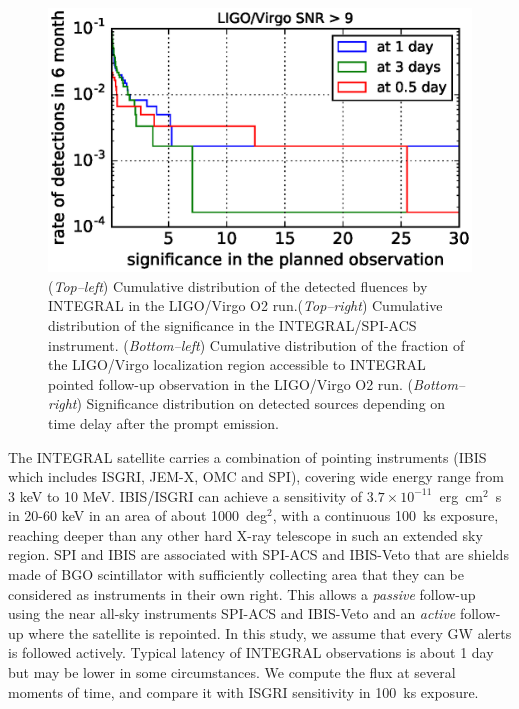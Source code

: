 \documentclass[11pt]{article}
\begin{document}
\begin{figure}
    \includegraphics[scale=.4]{P7-1_f4.eps}
    \caption{(\textit{Top--left}) Cumulative distribution of the detected
      fluences by INTEGRAL in the LIGO/Virgo O2 run.(\textit{Top--right})
      Cumulative distribution of the significance in the INTEGRAL/SPI-ACS
      instrument.  (\textit{Bottom--left}) Cumulative distribution of the
      fraction of the LIGO/Virgo localization region accessible to INTEGRAL
      pointed follow-up observation in the LIGO/Virgo O2
      run. (\textit{Bottom--right}) Significance distribution on detected
      sources depending on time delay after the prompt emission.}
    \label{fluence_significance}
\end{figure}

The INTEGRAL satellite \citep{integral} carries a combination of pointing
instruments (IBIS which includes ISGRI, JEM-X, OMC and SPI), covering wide
energy range from 3 keV to 10 MeV. IBIS/ISGRI can achieve a sensitivity of $3.7
\times 10^{-11}$~erg~cm$^2$~s in 20-60 keV in an area of about 1000~deg$^{2}$,
with a continuous 100~ks exposure, reaching deeper than any other hard X-ray
telescope in such an extended sky region. SPI and IBIS are associated with
SPI-ACS and IBIS-Veto that are shields made of BGO scintillator with
sufficiently collecting area that they can be considered as instruments in their
own right.  This allows a \textit{passive} follow-up using the near all-sky
instruments SPI-ACS and IBIS-Veto and an \textit{active} follow-up where the
satellite is repointed.  In this study, we assume that every GW alerts is
followed actively.  Typical latency of INTEGRAL observations is about 1 day but
may be lower in some circumstances. We compute the flux at several moments of
time, and compare it with ISGRI sensitivity in 100~ks exposure.
\end{document}
